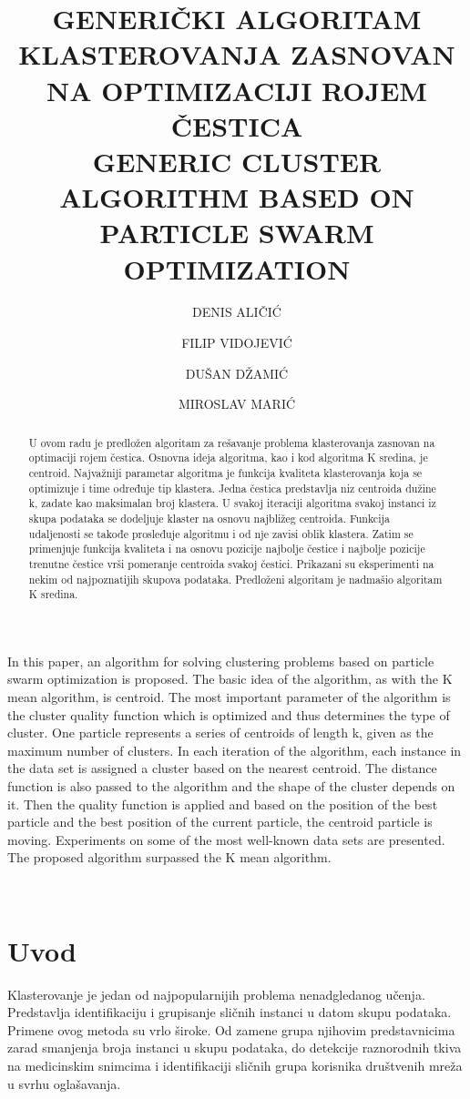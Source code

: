 \documentclass[a4paper,serbian]{symopissr}
\title{GENERIČKI ALGORITAM KLASTEROVANJA ZASNOVAN NA OPTIMIZACIJI ROJEM ČESTICA\\GENERIC CLUSTER ALGORITHM BASED ON PARTICLE SWARM OPTIMIZATION}
\author[1]{DENIS ALIČIĆ}
\author[1]{FILIP VIDOJEVIĆ}
\author[2]{DUŠAN DŽAMIĆ}
\author[1]{MIROSLAV MARIĆ}
\affil[1]{Matematički fakultet, 
          Studentski trg 16, Beograd, Srbija\\
          \{denis\char`_alicic, filip\char`_vidojevic, maricm\}@matf.bg.ac.rs}
\affil[2]{Fakultet organizacionih nauka,
		  Jova Ilića 154, Beograd, Srbija,
		  dusan.dzamic@fon.bg.ac.rs}
\begin{document}
\maketitle


\begin{abstract}
U ovom radu je predložen algoritam za rešavanje problema klasterovanja zasnovan na optimaciji rojem čestica. Osnovna ideja algoritma, kao i kod algoritma K sredina, je centroid. Najvažniji parametar algoritma je funkcija kvaliteta klasterovanja koja se optimizuje i time određuje tip klastera. Jedna čestica predstavlja niz centroida dužine k, zadate kao maksimalan broj klastera.
U svakoj iteraciji algoritma svakoj instanci iz skupa podataka se dodeljuje klaster na osnovu najbližeg centroida. Funkcija udaljenosti se takođe prosleđuje algoritmu i od nje zavisi oblik klastera. Zatim se primenjuje funkcija kvaliteta i na osnovu pozicije najbolje čestice i najbolje pozicije trenutne čestice vrši pomeranje centroida svakoj čestici. Prikazani su eksperimenti na nekim od najpoznatijih skupova podataka. Predloženi algoritam je nadmašio algoritam K sredina.
\end{abstract}
\bigskip
\begin{abstractEN}
In this paper, an algorithm for solving clustering problems based on particle swarm optimization is proposed. The basic idea of the algorithm, as with the K mean algorithm, is centroid. The most important parameter of the algorithm is the cluster quality function which is optimized and thus determines the type of cluster. One particle represents a series of centroids of length k, given as the maximum number of clusters.
In each iteration of the algorithm, each instance in the data set is assigned a cluster based on the nearest centroid. The distance function is also passed to the algorithm and the shape of the cluster depends on it. Then the quality function is applied and based on the position of the best particle and the best position of the current particle, the centroid particle is moving. Experiments on some of the most well-known data sets are presented. The proposed algorithm surpassed the K mean algorithm.
\end{abstractEN}
\\
\section{Uvod}
\label{sec:uvod}
Klasterovanje je jedan od najpopularnijih problema nenadgledanog učenja.
Predstavlja identifikaciju i grupisanje sličnih instanci u datom skupu podataka. Primene ovog metoda su vrlo široke.
Od zamene grupa njihovim predstavnicima zarad smanjenja broja instanci u skupu podataka, do detekcije raznorodnih tkiva na medicinskim snimcima i identifikaciji sličnih grupa korisnika društvenih mreža u svrhu oglašavanja.
\end{document}
